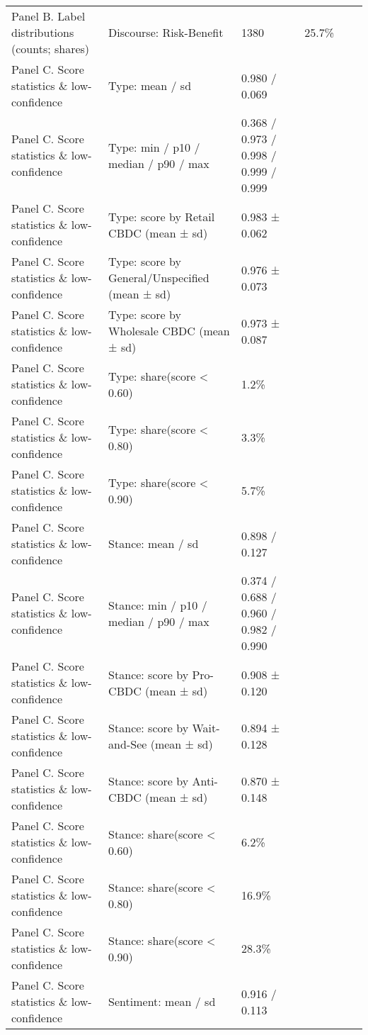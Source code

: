 \begin{longtable}{p{3.2cm}p{7.8cm}p{4.5cm}p{1.6cm}p{1.6cm}p{2.0cm}}
Panel B. Label distributions (counts; shares) & Discourse: Risk-Benefit & 1380 & 25.7\% &  &  \\
Panel C. Score statistics \& low-confidence & Type: mean / sd & 0.980 / 0.069 &  &  &  \\
Panel C. Score statistics \& low-confidence & Type: min / p10 / median / p90 / max & 0.368 / 0.973 / 0.998 / 0.999 / 0.999 &  &  &  \\
Panel C. Score statistics \& low-confidence & Type: score by Retail CBDC (mean ± sd) & 0.983 ± 0.062 &  &  &  \\
Panel C. Score statistics \& low-confidence & Type: score by General/Unspecified (mean ± sd) & 0.976 ± 0.073 &  &  &  \\
Panel C. Score statistics \& low-confidence & Type: score by Wholesale CBDC (mean ± sd) & 0.973 ± 0.087 &  &  &  \\
Panel C. Score statistics \& low-confidence & Type: share(score < 0.60) & 1.2\% &  &  &  \\
Panel C. Score statistics \& low-confidence & Type: share(score < 0.80) & 3.3\% &  &  &  \\
Panel C. Score statistics \& low-confidence & Type: share(score < 0.90) & 5.7\% &  &  &  \\
Panel C. Score statistics \& low-confidence & Stance: mean / sd & 0.898 / 0.127 &  &  &  \\
Panel C. Score statistics \& low-confidence & Stance: min / p10 / median / p90 / max & 0.374 / 0.688 / 0.960 / 0.982 / 0.990 &  &  &  \\
Panel C. Score statistics \& low-confidence & Stance: score by Pro-CBDC (mean ± sd) & 0.908 ± 0.120 &  &  &  \\
Panel C. Score statistics \& low-confidence & Stance: score by Wait-and-See (mean ± sd) & 0.894 ± 0.128 &  &  &  \\
Panel C. Score statistics \& low-confidence & Stance: score by Anti-CBDC (mean ± sd) & 0.870 ± 0.148 &  &  &  \\
Panel C. Score statistics \& low-confidence & Stance: share(score < 0.60) & 6.2\% &  &  &  \\
Panel C. Score statistics \& low-confidence & Stance: share(score < 0.80) & 16.9\% &  &  &  \\
Panel C. Score statistics \& low-confidence & Stance: share(score < 0.90) & 28.3\% &  &  &  \\
Panel C. Score statistics \& low-confidence & Sentiment: mean / sd & 0.916 / 0.113 &  &  &  \\

\end{longtable}

